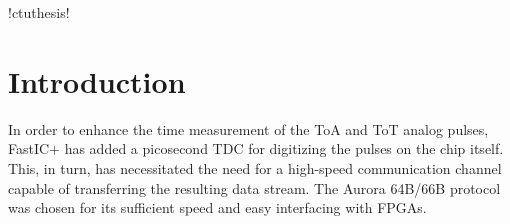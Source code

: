 \documentclass[twoside]{ctuthesis}
\theoremstyle{plain}
\theoremstyle{definition}
\theoremstyle{note}
\begin{document}
\renewcommand \ctulstsep {0pt}

\newcommand\ctuclsname{\leavevmode\unhcopy\ctuclsnamebox}
\newsavebox\ctuclsnamebox
\begin{lrbox}{\ctuclsnamebox}
\ctulst!ctuthesis!
\end{lrbox}

\maketitle


\newpage
\begingroup
\color{black}
\tableofcontents
\endgroup

\pagebreak

\chapter{Introduction}
In order to enhance the time measurement of the ToA and ToT analog pulses, FastIC+ has added a picosecond TDC for digitizing the pulses on the chip itself. This, in turn, has necessitated the need for a high-speed communication channel capable of transferring the resulting data stream. The Aurora 64B/66B protocol was chosen for its sufficient speed and easy interfacing with FPGAs.











\clearpage
\FloatBarrier
\printbibliography
\end{document}
